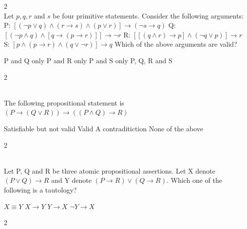 \documentclass[12pt]{exam}
\begin{document}
\begin{questions}
\begin{multicols*}{2}
 \\[0.2cm]
{\Large Let $p, q, r$ and $s$ be four primitive statements. Consider the following arguments:\newline
P: $[(\neg p \vee q) \wedge (r \to s) \wedge (p \vee r)] \to (\neg s \to q)$ \newline
Q: $[(\neg p \wedge q) \wedge [q \to (p \to r)]] \to \neg r$ \newline
R: $[[(q \wedge r) \to p] \wedge (\neg q \vee p)] \to r$ S: $[p \wedge (p \to r) \wedge (q \vee \neg r)] \to q$ \newline
Which of the above arguments are valid?}
\begin{choices}
  \choice P and Q only
  \choice P and R only
  \choice P and S only
  \choice P, Q, R and S
\end{choices}

\end{multicols*}
\vspace{0.6cm}
\newpage
\begin{multicols*}{2}

 \\[0.2cm]
{\Large The following propositional statement is \newline
$(P \to (Q \vee R)) \to ((P \wedge Q) \to R)$}
\begin{choices}
  \choice Satisfiable but not valid
  \choice Valid
  \choice A contraditiction
  \choice None of the above
\end{choices}

\end{multicols*}
\vspace{0.6cm}
\newpage
\begin{multicols*}{2}

 \\[0.2cm]
{\Large Let P, Q and R be three atomic propositional assertions. Let X denote $(P \vee Q) \to R$ and Y denote $(P \to R) \vee (Q \to R)$. Which one of the following is a tautology?}
\begin{choices}
  \choice $X \equiv Y$
  \choice $X \to Y$
  \choice $Y \to X$
  \choice $\neg Y \to X$
\end{choices}

\end{multicols*}
\vspace{0.6cm}
\newpage
\begin{multicols*}{2}


\end{multicols*}
\end{questions}
\end{document}
